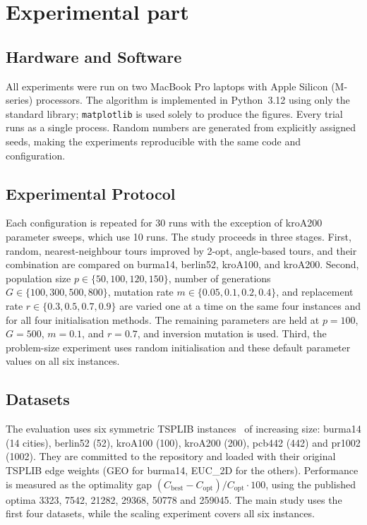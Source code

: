 \documentclass[11pt,a4paper]{article}
\begin{document}
\section{Experimental part}
\label{sec:experimental}

\subsection{Hardware and Software}
All experiments were run on two MacBook Pro laptops with Apple Silicon
(M-series) processors. The algorithm is implemented in Python~3.12 using only
the standard library; \texttt{matplotlib} is used solely to produce the
figures. Every trial runs as a single process. Random numbers are generated
from explicitly assigned seeds, making the experiments reproducible with the
same code and configuration.

\subsection{Experimental Protocol}
Each configuration is repeated for 30 runs with the exception of kroA200 parameter sweeps, 
which use 10 runs. 
The study proceeds in three stages. 
First, random, nearest-neighbour tours improved by 2-opt, angle-based
tours, and their combination are compared on burma14, berlin52, kroA100, and
kroA200. Second, population size $p \in \{50,100,120,150\}$, number of
generations $G \in \{100,300,500,800\}$, mutation rate
$m \in \{0.05,0.1,0.2,0.4\}$, and replacement rate
$r \in \{0.3,0.5,0.7,0.9\}$ are varied one at a time on the same four
instances and for all four initialisation methods. The remaining parameters
are held at $p=100$, $G=500$, $m=0.1$, and $r=0.7$, and inversion mutation is
used. Third, the problem-size experiment uses random initialisation and these
default parameter values on all six instances.

\subsection{Datasets}
The evaluation uses six symmetric TSPLIB instances~\cite{reinelt1991} of
increasing size: burma14 (14 cities), berlin52 (52), kroA100 (100), kroA200
(200), pcb442 (442) and pr1002 (1002). They are committed to the repository
and loaded with their original TSPLIB edge weights (GEO for burma14, EUC\_2D
for the others). Performance is measured as the optimality gap
$(C_{\mathrm{best}}-C_{\mathrm{opt}})/C_{\mathrm{opt}}\cdot 100$, using the
published optima 3323, 7542, 21282, 29368, 50778 and 259045. The main study
uses the first four datasets, while the scaling experiment covers all six instances.
\end{document}
